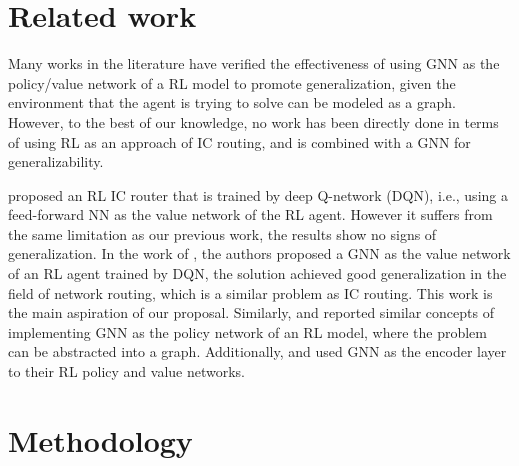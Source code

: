 \documentclass[letterpaper]{article}
\begin{document}




\section{Related work}
Many works in the literature have verified the effectiveness of using GNN as the policy/value network of a RL model to promote generalization, given the environment that the agent is trying to solve can be modeled as a graph. However, to the best of our knowledge, no work has been directly done in terms of using RL as an approach of IC routing, and is combined with a GNN for generalizability.

\cite{Liao2020} proposed an RL IC router that is trained by deep Q-network (DQN), i.e., using a feed-forward NN as the value network of the RL agent. However it suffers from the same limitation as our previous work, the results show no signs of generalization. In the work of \cite{Almasan2022}, the authors proposed a GNN as the value network of an RL agent trained by DQN, the solution achieved good generalization in the field of network routing, which is a similar problem as IC routing. This work is the main aspiration of our proposal. Similarly, \cite{Chen2023} and \cite{Wang2018} reported similar concepts of implementing GNN as the policy network of an RL model, where the problem can be abstracted into a graph. Additionally, \cite{Mirhoseini2021} and \cite{Yue2022} used GNN as the encoder layer to their RL policy and value networks. 
    
\section{Methodology}
\end{document}
